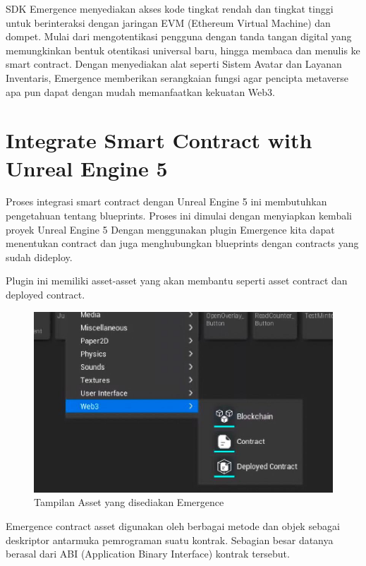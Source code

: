 SDK Emergence menyediakan akses kode tingkat rendah dan tingkat tinggi untuk berinteraksi dengan jaringan EVM (Ethereum Virtual Machine) dan dompet. Mulai dari mengotentikasi pengguna dengan tanda tangan digital yang memungkinkan bentuk otentikasi universal baru, hingga membaca dan menulis ke smart contract. Dengan menyediakan alat seperti Sistem Avatar dan Layanan Inventaris, Emergence memberikan serangkaian fungsi agar pencipta metaverse apa pun dapat dengan mudah memanfaatkan kekuatan Web3.

\section{Integrate Smart Contract with Unreal Engine 5}

Proses integrasi smart contract dengan Unreal Engine 5 ini membutuhkan pengetahuan tentang blueprints. Proses ini dimulai dengan menyiapkan kembali proyek Unreal Engine 5
Dengan menggunakan plugin Emergence kita dapat menentukan contract dan juga menghubungkan blueprints dengan contracts yang sudah dideploy.

Plugin ini memiliki asset-asset yang akan membantu seperti asset contract dan deployed contract.

\begin{figure}[H]
  \centering

  \includegraphics[scale=0.3]{gambar/web3emergence.jpg}

  \caption{Tampilan Asset yang disediakan Emergence}
  \label{fig:web3emergence}
\end{figure}

Emergence contract asset digunakan oleh berbagai metode dan objek sebagai deskriptor antarmuka pemrograman suatu kontrak. Sebagian besar datanya berasal dari ABI (Application Binary Interface) kontrak tersebut.

